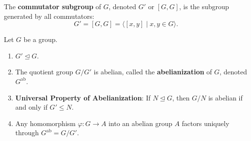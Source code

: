 \begin{definition}
The \textbf{commutator subgroup} of $G$, denoted $G'$ or $[G, G]$, is the subgroup generated by all commutators:
\begin{equation}
G' = [G, G] = \langle [x, y] \mid x, y \in G \rangle.
\end{equation}
\end{definition}

\begin{theorem}
\label{thm:commutator_props}
Let $G$ be a group.
\begin{enumerate}[label=\textbf{(\roman*)}, leftmargin=*, itemsep=4pt]
    \item $G' \trianglelefteq G$.
    \item The quotient group $G/G'$ is abelian, called the \textbf{abelianization} of $G$, denoted $G^{\text{ab}}$.
    \item \textbf{Universal Property of Abelianization}: If $N \trianglelefteq G$, then $G/N$ is abelian if and only if $G' \le N$.
    \item Any homomorphism $\varphi: G \to A$ into an abelian group $A$ factors uniquely through $G^{\text{ab}} = G/G'$.
\end{enumerate}
\end{theorem}


